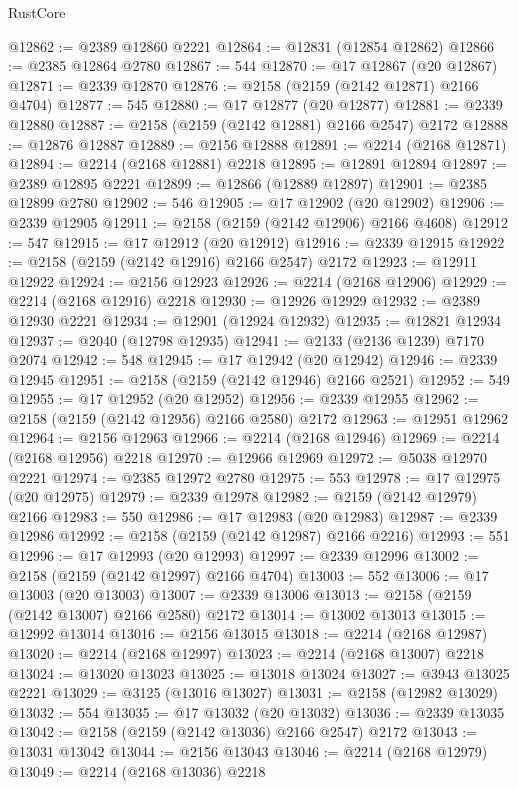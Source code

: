\begin{lexlean}{RustCore}
\begin{coremodule}
@12862 := @2389 @12860 @2221
@12864 := @12831 (@12854 @12862)
@12866 := @2385 @12864 @2780
@12867 := 544
@12870 := @17 @12867 (@20 @12867)
@12871 := @2339 @12870
@12876 := @2158 (@2159 (@2142 @12871) @2166 @4704)
@12877 := 545
@12880 := @17 @12877 (@20 @12877)
@12881 := @2339 @12880
@12887 := @2158 (@2159 (@2142 @12881) @2166 @2547) @2172
@12888 := @12876 @12887
@12889 := @2156 @12888
@12891 := @2214 (@2168 @12871)
@12894 := @2214 (@2168 @12881) @2218
@12895 := @12891 @12894
@12897 := @2389 @12895 @2221
@12899 := @12866 (@12889 @12897)
@12901 := @2385 @12899 @2780
@12902 := 546
@12905 := @17 @12902 (@20 @12902)
@12906 := @2339 @12905
@12911 := @2158 (@2159 (@2142 @12906) @2166 @4608)
@12912 := 547
@12915 := @17 @12912 (@20 @12912)
@12916 := @2339 @12915
@12922 := @2158 (@2159 (@2142 @12916) @2166 @2547) @2172
@12923 := @12911 @12922
@12924 := @2156 @12923
@12926 := @2214 (@2168 @12906)
@12929 := @2214 (@2168 @12916) @2218
@12930 := @12926 @12929
@12932 := @2389 @12930 @2221
@12934 := @12901 (@12924 @12932)
@12935 := @12821 @12934
@12937 := @2040 (@12798 @12935)
@12941 := @2133 (@2136 @1239) @7170 @2074
@12942 := 548
@12945 := @17 @12942 (@20 @12942)
@12946 := @2339 @12945
@12951 := @2158 (@2159 (@2142 @12946) @2166 @2521)
@12952 := 549
@12955 := @17 @12952 (@20 @12952)
@12956 := @2339 @12955
@12962 := @2158 (@2159 (@2142 @12956) @2166 @2580) @2172
@12963 := @12951 @12962
@12964 := @2156 @12963
@12966 := @2214 (@2168 @12946)
@12969 := @2214 (@2168 @12956) @2218
@12970 := @12966 @12969
@12972 := @5038 @12970 @2221
@12974 := @2385 @12972 @2780
@12975 := 553
@12978 := @17 @12975 (@20 @12975)
@12979 := @2339 @12978
@12982 := @2159 (@2142 @12979) @2166
@12983 := 550
@12986 := @17 @12983 (@20 @12983)
@12987 := @2339 @12986
@12992 := @2158 (@2159 (@2142 @12987) @2166 @2216)
@12993 := 551
@12996 := @17 @12993 (@20 @12993)
@12997 := @2339 @12996
@13002 := @2158 (@2159 (@2142 @12997) @2166 @4704)
@13003 := 552
@13006 := @17 @13003 (@20 @13003)
@13007 := @2339 @13006
@13013 := @2158 (@2159 (@2142 @13007) @2166 @2580) @2172
@13014 := @13002 @13013
@13015 := @12992 @13014
@13016 := @2156 @13015
@13018 := @2214 (@2168 @12987)
@13020 := @2214 (@2168 @12997)
@13023 := @2214 (@2168 @13007) @2218
@13024 := @13020 @13023
@13025 := @13018 @13024
@13027 := @3943 @13025 @2221
@13029 := @3125 (@13016 @13027)
@13031 := @2158 (@12982 @13029)
@13032 := 554
@13035 := @17 @13032 (@20 @13032)
@13036 := @2339 @13035
@13042 := @2158 (@2159 (@2142 @13036) @2166 @2547) @2172
@13043 := @13031 @13042
@13044 := @2156 @13043
@13046 := @2214 (@2168 @12979)
@13049 := @2214 (@2168 @13036) @2218

\end{coremodule}
\end{lexlean}
